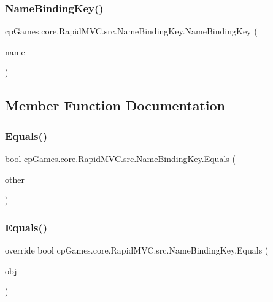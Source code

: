 \subsubsection{\texorpdfstring{NameBindingKey()}{NameBindingKey()}}
{\footnotesize\ttfamily cp\+Games.\+core.\+Rapid\+M\+V\+C.\+src.\+Name\+Binding\+Key.\+Name\+Binding\+Key (\begin{DoxyParamCaption}\item[{string}]{name }\end{DoxyParamCaption})}



\subsection{Member Function Documentation}
\mbox{\label{classcp_games_1_1core_1_1_rapid_m_v_c_1_1src_1_1_name_binding_key_a333bc85a05489a2dee4ffb14af788ee8}} 
\subsubsection{\texorpdfstring{Equals()}{Equals()}\hspace{0.1cm}{\footnotesize\ttfamily [1/2]}}
{\footnotesize\ttfamily bool cp\+Games.\+core.\+Rapid\+M\+V\+C.\+src.\+Name\+Binding\+Key.\+Equals (\begin{DoxyParamCaption}\item[{\mbox{\hyperlink{classcp_games_1_1core_1_1_rapid_m_v_c_1_1src_1_1_name_binding_key}{Name\+Binding\+Key}}}]{other }\end{DoxyParamCaption})\hspace{0.3cm}{\ttfamily [protected]}}

\mbox{\label{classcp_games_1_1core_1_1_rapid_m_v_c_1_1src_1_1_name_binding_key_aadb92be16b88b244adcec18fcd2c83e8}} 
\subsubsection{\texorpdfstring{Equals()}{Equals()}\hspace{0.1cm}{\footnotesize\ttfamily [2/2]}}
{\footnotesize\ttfamily override bool cp\+Games.\+core.\+Rapid\+M\+V\+C.\+src.\+Name\+Binding\+Key.\+Equals (\begin{DoxyParamCaption}\item[{object}]{obj }\end{DoxyParamCaption})}

